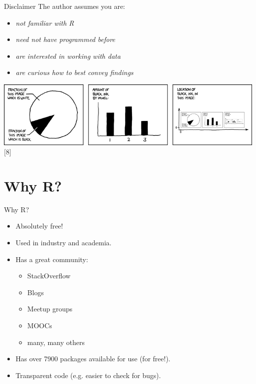 \normalfont
\begin{frame}
	\begin{center}
  		\begin{block}{Disclaimer} 
The author assumes you are:
	\begin{itemize}
		\item \itshape not \normalfont familiar with \ttfamily R \normalfont 
		\item \itshape need not \normalfont have programmed before
		\item \itshape are \normalfont interested in working with data 
		\item \itshape are \normalfont curious how to best convey findings
	\end{itemize} 
	\end{block}

	       \begin{center}
	         \includegraphics[scale=0.35]{images/xkcd-self_description}[8]
	        \end{center}

	\end{center} 
\end{frame}

\section{Why R?}
\begin{frame}
	\begin{center}
  		\begin{block}{Why R?} 
			\begin{itemize}
				\item Absolutely free!
				\item Used in industry and academia.
				\item Has a great community:
					\begin{itemize}
						\item StackOverflow
						\item Blogs
						\item Meetup groups
						\item MOOCs
						\item many, many others
					\end{itemize}
				\item Has over 7900 packages available for use (for free!).
				\item Transparent code (e.g. easier to check for bugs).
			\end{itemize}
		\end{block}
	\end{center} 
\end{frame}

